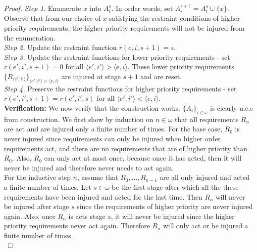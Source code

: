 \documentclass{article}
\begin{document}
\begin{enumerate}[label={(\roman*)}]
\begin{proof}
        \textit{Step 1.} Enumerate $x$ into $A_i^s$. In order words, set
        $A_i^{s+1}=A_i^s\cup\{x\}$. Observe that from our choice of $x$
        satisfying the restraint conditions of higher priority
        requirements, the higher priority requirements will not be injured
        from the enumeration. \\

        \textit{Step 2.} Update the restraint function $r(e,i,s+1)=s$. \\

        \textit{Step 3.} Update the restraint functions for lower priority
        requirements - set $r(e',i',s+1)=0$ for all $\langle e',i'\rangle
        >\langle e,i\rangle$. These lower priority requirements
        $\{R_{\langle e',i'\rangle}\}_{\langle e',i'\rangle >\langle
        e,i\rangle}$ are injured at stage $s+1$ and are reset. \\

        \textit{Step 4.} Preserve the restraint functions for higher
        priority requirements - set $r(e',i',s+1)=r(e',i',s)$ for all
        $\langle e',i'\rangle <\langle e,i\rangle$. \\

        \textbf{Verification:} We now verify that the construction works.
        $\{A_i\}_{i\in\omega}$ is clearly u.c.e from construction. We first
        show by induction on $n\in\omega$ that all
        requirements $R_{n}$ are act and are injured
        only a finite number of times. For the base case, $R_0$ is never
        injured since requirements can only be injured when higher order
        requirements act, and there are no requirements that are
        of higher priority than $R_0$. Also, $R_0$ can only act at
        most once, because once it has acted, then it will never be
        injured and therefore never needs to act again. \\

        For the inductive step $n$, assume that $R_0,\ldots,R_{n-1}$ are
        all only injured and acted a finite number of times. Let
        $s\in\omega$ be the first stage after which all the these
        requirements have been injured and acted for the last time.
        Then $R_n$ will never be injured after stage $s$ since the
        requirements of higher priority are never injured again.
        Also, once $R_n$ is acts stage $s$, it will never be
        injured since the higher priority requirements never act
        again. Therefore $R_n$ will only act or be injured a finite
        number of times. \\


\end{proof}
\end{enumerate}
\end{document}
